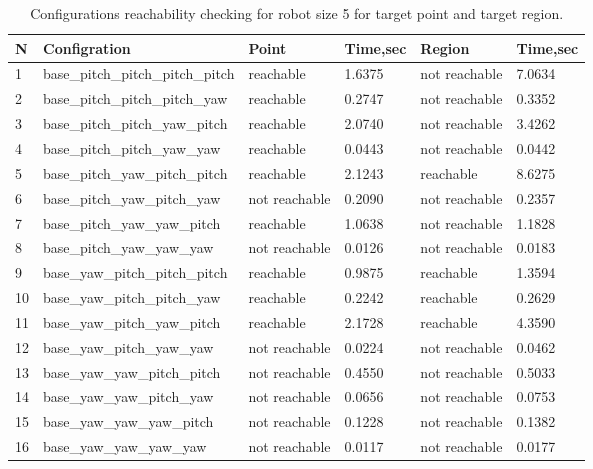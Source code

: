 \begin{table}[h!]
\begin{tabular}{|l|l|l|l|l|l|}
\hline
N  & Configration                           & Point  & Time,sec   & Region  & Time,sec    \\ \hline
1  & base\_pitch\_pitch\_pitch\_pitch  & reachable        & 1.6375   & not reachable    & 7.0634  \\ \hline
2  &  base\_pitch\_pitch\_pitch\_yaw   & reachable        & 0.2747   & not reachable    & 0.3352  \\ \hline
3  &  base\_pitch\_pitch\_yaw\_pitch   & reachable        & 2.0740   & not reachable    & 3.4262  \\ \hline
4  &  base\_pitch\_pitch\_yaw\_yaw     & reachable        & 0.0443   & not reachable    & 0.0442  \\ \hline
5  &  base\_pitch\_yaw\_pitch\_pitch   & reachable        & 2.1243   & reachable        & 8.6275  \\ \hline
6  &  base\_pitch\_yaw\_pitch\_yaw     & not reachable    & 0.2090   & not reachable    & 0.2357  \\ \hline
7  &  base\_pitch\_yaw\_yaw\_pitch     & reachable        & 1.0638   & not reachable    & 1.1828  \\ \hline
8  &  base\_pitch\_yaw\_yaw\_yaw       & not reachable    & 0.0126   & not reachable    & 0.0183  \\ \hline
9  &  base\_yaw\_pitch\_pitch\_pitch   & reachable        & 0.9875   & reachable        & 1.3594  \\ \hline
10 &  base\_yaw\_pitch\_pitch\_yaw     & reachable        & 0.2242   & reachable        & 0.2629  \\ \hline
11 &  \cellcolor{green!20}base\_yaw\_pitch\_yaw\_pitch     & reachable        & 2.1728   & reachable        & 4.3590  \\ \hline
12 &  base\_yaw\_pitch\_yaw\_yaw       & not reachable    & 0.0224   & not reachable    & 0.0462  \\ \hline
13 &  base\_yaw\_yaw\_pitch\_pitch     & not reachable    & 0.4550   &  not reachable   & 0.5033  \\ \hline
14 &  base\_yaw\_yaw\_pitch\_yaw       & not reachable    & 0.0656   & not reachable    & 0.0753  \\ \hline
15 &  base\_yaw\_yaw\_yaw\_pitch       & not reachable    & 0.1228   & not reachable    & 0.1382  \\ \hline
16 &  base\_yaw\_yaw\_yaw\_yaw         & not reachable    & 0.0117   & not reachable    & 0.0177  \\ \hline
\end{tabular}
\caption{Configurations reachability checking for robot size 5 for target point and target region.}
\label{tab:conf5individ}
\end{table}


